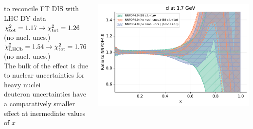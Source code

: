 \documentclass{beamer}
\begin{document}
\begin{frame}
\begin{columns}[c]
\begin{column}{0.5\textwidth}
   to reconcile FT DIS with LHC DY data\\
   \vspace{0.1cm}
   {\scriptsize $\chi^2_{\rm tot}=1.17\to \chi^2_{\rm tot}=1.26$ (no nucl. uncs.)}\\
   {\scriptsize $\chi^2_{\rm LHCb}=1.54\to \chi^2_{\rm tot}=1.76$ (no nucl. uncs.)}\\
   \vspace{0.2cm}
   The bulk of the effect is due to nuclear uncertainties for heavy nuclei\\
   {\scriptsize deuteron uncertainties have a comparatively smaller effect at inermediate values of $x$}\\
  \end{column}
  \begin{column}{0.5\textwidth}
   \centering
   \includegraphics[width=\columnwidth]{plots/nuclear_d}\\   
  \end{column}
 \end{columns}
\end{frame}
\end{document}
